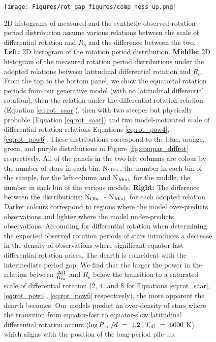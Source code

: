 \begin{figure}
\centering
 \texttt{[image: Figures/rot\_gap\_figures/comp\_hess\_up.png]}
 \caption[2D histograms of measured and the synthetic observed rotation period distribution assuming various relations between the scale of differential rotation and $R_o$ and the difference between the two.]{
2D histograms of measured and the synthetic observed rotation period distribution assume various relations between the scale of differential rotation and $R_o$ and the difference between the two.
\textbf{Left:} 2D histogram of the \citet{mcquillan_rotation_2014} rotation period distribution.
\textbf{Middle:} 2D histogram of the measured rotation period distributions under the adopted relations between latitudinal differential rotation and $R_o$. From the top to the bottom panel, we show the equatorial rotation periods from our generative model (with no latitudinal differential rotation), then the relation under the \citet{saar_starspots_2011} differential rotation relation (Equation \ref{eq:rot_saar}), then with two steeper but physically probable (Equation \ref{eq:rot_saar}) and two model-motivated \citep{brun_powering_2022} scale of differential rotation relations Equations \ref{eq:rot_pow4}, \ref{eq:rot_pow6}.
These distributions correspond to the blue, orange, green, and purple distributions in Figure \ref{fig:compar_diffrot} respectively.
All of the panels in the two left columns are colour by the number of stars in each bin: N$_{\rm{Obs.}}$, the number in each bin of the \citet{mcquillan_rotation_2014} sample, for the left column and N$_{\rm{Mod.}}$ for the middle, the number in each bin of the various models. \textbf{Right:} The difference between the distributions: N$_{\rm{Obs.}}$ - N$_{\rm{Mod.}}$ for each adopted relation.
Darker colours correspond to regions where the model over-predicts observations and lighter where the model under-predicts observations. Accounting for differential rotation when determining the expected observed rotation periods of stars introduces a decrease in the density of observations where significant equator-fast differential rotation arises.
The dearth is coincident with the intermediate period gap. We find that the larger the power in the relation between $\frac{\Delta\Omega}{\Omega_{\rm{eq}}}$ and $R_o$ below the transition to a saturated scale of differential rotation (2, 4, and 8 for Equations \ref{eq:rot_saar}, \ref{eq:rot_pow4}, \ref{eq:rot_pow6} respectively), the more apparent the dearth becomes. Our models predict an over-density of stars where the transition from equator-fast to equator-slow latitudinal differential rotation occurs ($\log P_{\rm{rot}}/d \ = \ 1.2$, $T_{\rm{eff}} \ = \ 6000$ K) which aligns with the position of the long-period pile-up.}
 \label{fig:comp_hess}
\end{figure}

